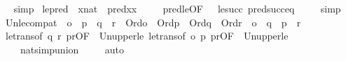 \begin{isabellebody}
\isadelimproof
\ %
\endisadelimproof
%
\isatagproof
{}\isamarkupfalse%
\ simp%
\endisatagproof
{\isafoldproof}%
%
\isadelimproof
%
\endisadelimproof
\isanewline
{}\isamarkupfalse%
\ le{\isacharunderscore}{\kern0pt}pred\ {\isacharcolon}{\kern0pt}\ {\isachardoublequoteopen}x{\isasymin}nat\ {\isasymLongrightarrow}\ pred{\isacharparenleft}{\kern0pt}x{\isacharparenright}{\kern0pt}{\isasymle}x{\isachardoublequoteclose}\ \isanewline
%
\isadelimproof
\ \ %
\endisadelimproof
%
\isatagproof
{}\isamarkupfalse%
\ pred{\isacharunderscore}{\kern0pt}le{\isacharbrackleft}{\kern0pt}OF\ {\isacharunderscore}{\kern0pt}\ {\isacharunderscore}{\kern0pt}\ le{\isacharunderscore}{\kern0pt}succ{\isacharbrackright}{\kern0pt}\ pred{\isacharunderscore}{\kern0pt}succ{\isacharunderscore}{\kern0pt}eq\ \isanewline
\ \ \isamarkupfalse%
\ simp%
\endisatagproof
{\isafoldproof}%
%
\isadelimproof
\isanewline
%
\endisadelimproof
\isanewline
{}\isamarkupfalse%
\ Un{\isacharunderscore}{\kern0pt}le{\isacharunderscore}{\kern0pt}compat\ {\isacharcolon}{\kern0pt}\ {\isachardoublequoteopen}o\ {\isasymle}\ p\ {\isasymLongrightarrow}\ q\ {\isasymle}\ r\ {\isasymLongrightarrow}\ Ord{\isacharparenleft}{\kern0pt}o{\isacharparenright}{\kern0pt}\ {\isasymLongrightarrow}\ Ord{\isacharparenleft}{\kern0pt}p{\isacharparenright}{\kern0pt}\ {\isasymLongrightarrow}\ Ord{\isacharparenleft}{\kern0pt}q{\isacharparenright}{\kern0pt}\ {\isasymLongrightarrow}\ Ord{\isacharparenleft}{\kern0pt}r{\isacharparenright}{\kern0pt}\ {\isasymLongrightarrow}\ o\ {\isasymunion}\ q\ {\isasymle}\ p\ {\isasymunion}\ r{\isachardoublequoteclose}\isanewline
%
\isadelimproof
\ \ %
\endisadelimproof
%
\isatagproof
{}\isamarkupfalse%
\ le{\isacharunderscore}{\kern0pt}trans{\isacharbrackleft}{\kern0pt}of\ q\ r\ {\isachardoublequoteopen}p{\isasymunion}r{\isachardoublequoteclose}{\isacharcomma}{\kern0pt}OF\ {\isacharunderscore}{\kern0pt}\ Un{\isacharunderscore}{\kern0pt}upper{}{\isacharunderscore}{\kern0pt}le{\isacharbrackright}{\kern0pt}\ le{\isacharunderscore}{\kern0pt}trans{\isacharbrackleft}{\kern0pt}of\ o\ p\ {\isachardoublequoteopen}p{\isasymunion}r{\isachardoublequoteclose}{\isacharcomma}{\kern0pt}OF\ {\isacharunderscore}{\kern0pt}\ Un{\isacharunderscore}{\kern0pt}upper{}{\isacharunderscore}{\kern0pt}le{\isacharbrackright}{\kern0pt}\isanewline
\ \ \ \ nat{\isacharunderscore}{\kern0pt}simp{\isacharunderscore}{\kern0pt}union\ \isanewline
\ \ \isamarkupfalse%
\ auto%
\endisatagproof
{\isafoldproof}%
%
\isadelimproof

\end{isabellebody}
